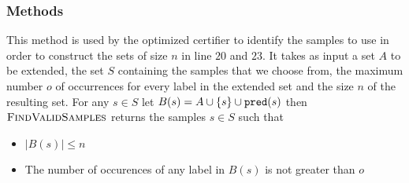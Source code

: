 \subsubsection{ Methods}

This method is used by the optimized certifier to identify the samples to use in order to construct the sets of size $n$ in line $20$ and $23$. It takes as input a set $A$ to be extended, the set $S$ containing the samples that we choose from, the maximum number $o$ of occurrences for every label in the extended set and the size $n$ of the resulting set. For any $s \in S$ let $B(s) = A \cup \{s\} \cup \boldsymbol{\mathtt{pred}}(s)$ then $\textsc{FindValidSamples}$ returns the samples $s \in S$ such that

\begin{itemize}
  \item $|B(s)| \leq n$
  \item The number of occurences of any label in $B(s)$ is not greater than $o$
\end{itemize}